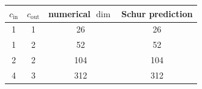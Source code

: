 \begin{tabular}{cccc}
\toprule
$c_{\mathrm{in}}$ & $c_{\mathrm{out}}$ & numerical $\dim$ & Schur prediction \\
\midrule
  1 & 1 & 26 & 26 \\
  1 & 2 & 52 & 52 \\
  2 & 2 & 104 & 104 \\
  4 & 3 & 312 & 312 \\
\bottomrule
\end{tabular}